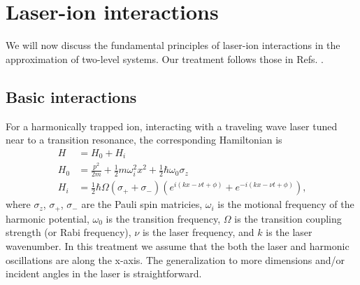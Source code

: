 \hfill
\section{Laser-ion interactions}

We will now discuss the fundamental principles of laser-ion interactions in the approximation of two-level systems. Our treatment follows those in Refs. \cite{Roos00.Thesis, Leibfried03.RMP.75.281}. 

\subsection{Basic interactions}
For a harmonically trapped ion, interacting with a traveling wave laser tuned near to a transition resonance, the corresponding Hamiltonian is
\begin{equation}
\begin{split}
H &= H_0 + H_i \\
H_0 &= \frac{p^2}{2 m} + \frac{1}{2} m \omega_i^2 x^2 + \frac{1}{2} \hbar \omega_0 \sigma_z \\
H_i &= \frac{1}{2} \hbar \Omega (\sigma_+ + \sigma_-) ( e^{i (kx - \nu t + \phi)} + e^{-i (kx - \nu t + \phi)} ) \text{,}	
\end{split}
\label{eq:basicH}
\end{equation}
where $\sigma_z$, $\sigma_+$, $\sigma_-$ are the Pauli spin matricies, $\omega_i$ is the motional frequency of the harmonic potential, $\omega_0$ is the transition frequency, $\Omega$ is the transition coupling strength (or Rabi frequency), $\nu$ is the laser frequency, and $k$ is the laser wavenumber. In this treatment we assume that the both the laser and harmonic oscillations are along the x-axis. The generalization to more dimensions and/or incident angles in the laser is straightforward. 

